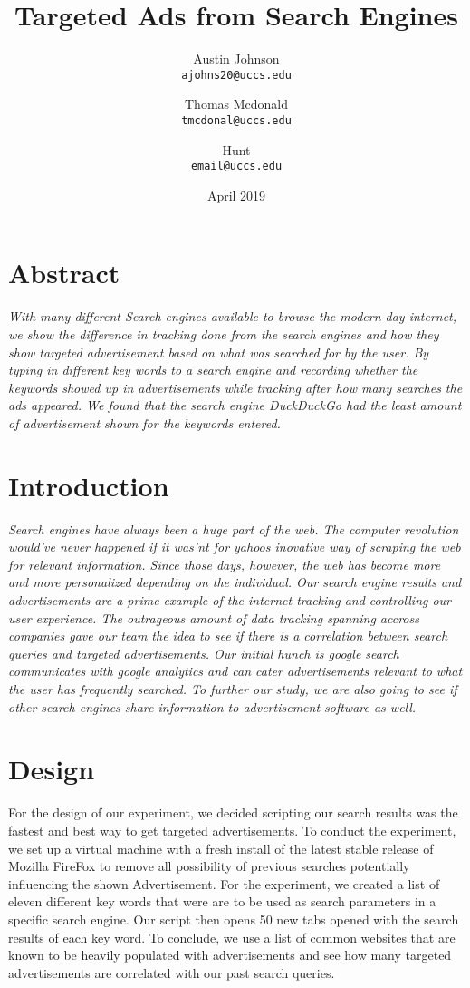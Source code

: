 \documentclass{article}
\author{Austin Johnson \\
\texttt{ajohns20@uccs.edu}
\and 
Thomas Mcdonald \\
\texttt{tmcdonal@uccs.edu}
\and 
Hunt \\
\texttt{email@uccs.edu}
}
\title{Targeted Ads from Search Engines}
\date{April 2019}
\begin{document}
\maketitle


\section{Abstract}
\small
\textit{
With many different Search engines available to browse the modern day internet, we show the difference in tracking done from the search engines and how they show targeted advertisement based on what was searched for by the user. By typing in different key words to a search engine and recording whether the keywords showed up in advertisements while tracking after how many searches the ads appeared. We found that the search engine DuckDuckGo had the least amount of advertisement shown for the keywords entered. }    

\section{Introduction}
\small
\textit{
	Search engines have always been a huge part of the web. The computer revolution would've never happened if it was'nt for yahoos inovative way of scraping the web for relevant information. Since those days, however, the web has become more and more personalized depending on the individual. Our search engine results and advertisements are a prime example of the internet tracking and controlling our user experience. The outrageous amount of data tracking spanning accross companies gave our team the idea to see if there is a correlation between search queries and targeted advertisements. Our initial hunch is google search communicates with google analytics and can cater advertisements relevant to what the user has frequently searched. To further our study, we are also going to see if other search engines share information to advertisement software as well.  
}

\section{Design}
For the design of our experiment, we decided scripting our search results was the fastest and best way to get targeted advertisements. To conduct the experiment, we set up a virtual machine with a fresh install of the latest stable release of Mozilla FireFox to remove all possibility of previous searches potentially influencing the shown Advertisement. For the experiment, we created a list of eleven different key words that were are to be used as search parameters in a specific search engine. Our script then opens 50 new tabs opened with the search results of each key word. To conclude, we use a list of common websites that are known to be heavily populated with advertisements and see how many targeted advertisements are correlated with our past search queries. 
\end{document}
